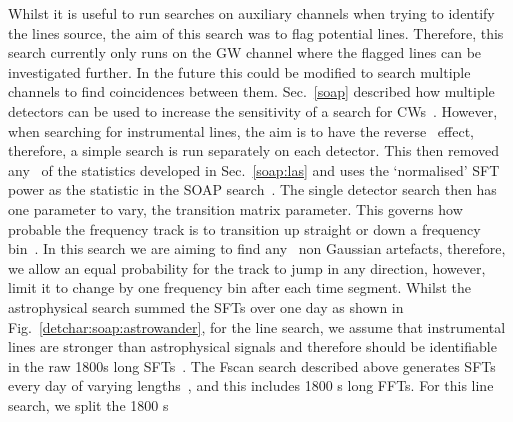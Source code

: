 Whilst it is useful to run searches on auxiliary channels when trying to
identify the lines source, the aim of this search was to flag potential lines.
Therefore, this search currently only runs on the \gls{GW} channel where the
flagged lines can be investigated further.  In the future this could be
modified to search multiple channels to find coincidences between them.
Sec.~\ref{soap} described how multiple detectors can be used to increase the
sensitivity of a search for \glspl{CW}~. However, when searching for
instrumental lines, the aim is to have the reverse~ effect, therefore, a simple search is run separately on
each detector.  This then removed any~ of the statistics developed in Sec.~\ref{soap:las} and uses the
`normalised' \gls{SFT} power as the statistic in the SOAP search~. The single
detector search then has one parameter to vary, the transition matrix
parameter.  This governs how probable the frequency track is to transition up
straight or down a frequency bin~.  In this search we are aiming to find any~ non Gaussian artefacts,
therefore, we allow an equal probability for the track to jump in any
direction, however, limit it to change by one frequency bin after each time
segment.  Whilst the astrophysical search summed the \glspl{SFT} over one day
as shown in Fig.~\ref{detchar:soap:astrowander}, for the line search, we assume
that instrumental lines are stronger than astrophysical signals and therefore
should be identifiable in the raw 1800s long \glspl{SFT}~. The Fscan search
described above generates \glspl{SFT} every day of varying lengths~, and this
includes 1800 s long \glspl{FFT}.  For this line search, we split the 1800 s
